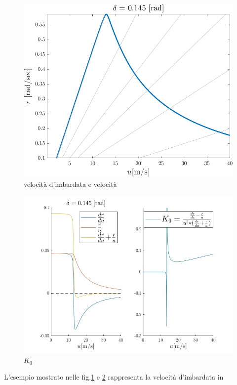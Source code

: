 \begin{figure}[!h]
    \centering
    \includegraphics[scale=0.7]{Immagini/Understeer Gradient/r vs u.png}
    \caption{velocità d'imbardata e velocità}
    \label{fig:r vs u delta=0.145}
\end{figure}
\begin{figure}[!h]
    \centering
    \includegraphics[scale=0.5]{Immagini/Understeer Gradient/K0.jpg}
    \caption{$K_0$}
    \label{fig:K0 delta=0.145}
\end{figure}
L'esempio mostrato nelle fig.\ref{fig:r vs u delta=0.145} e \ref{fig:K0 delta=0.145} rappresenta la velocità d'imbardata in
